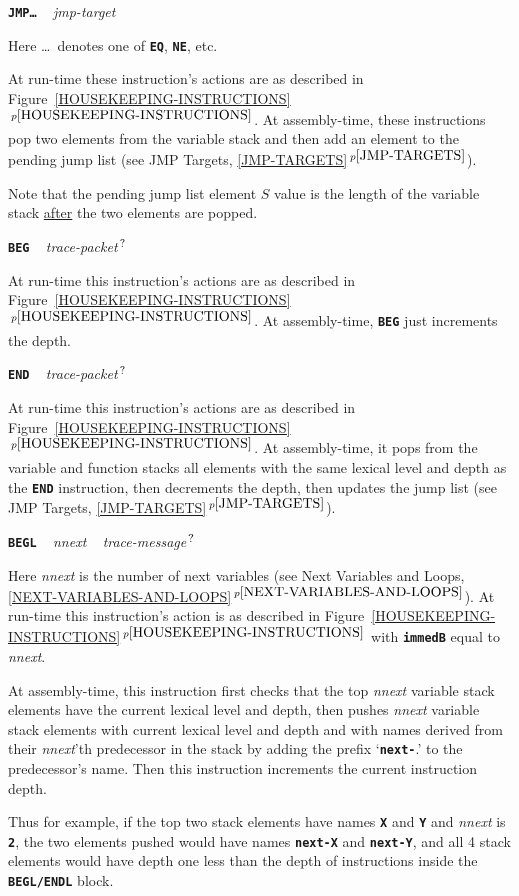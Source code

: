 \documentclass[12pt]{article}
\makeatletter
\newcommand{\TT}[1]{{\tt \bfseries #1}}
\newcommand{\QMARK}{{$^{\,\mbox{\footnotesize ?}}$}}
\newcommand{\ttkey}[1]{\TT{#1}\index{#1@{\tt #1}}}
\newcommand{\itemref}[1]{\ref{#1}$\,^{p\pageref{#1}}$}
\newenvironment{indpar}[1][0.3in]%
	{\begin{list}{}%
		     {\setlength{\itemsep}{0in}%
		      \setlength{\topsep}{0in}%
		      \setlength{\parsep}{1ex}%
		      \setlength{\labelwidth}{#1}%
		      \setlength{\leftmargin}{#1}%
		      \addtolength{\leftmargin}{\labelsep}}%
	 \item}%
	{\end{list}}
\makeatother
\begin{document}
\ttkey{JMP\ldots} ~ {\em jmp-target}
\begin{indpar}
Here \ldots~denotes one of \TT{EQ}, \TT{NE}, etc.

At run-time these instruction's actions are as described in
Figure~\itemref{HOUSEKEEPING-INSTRUCTIONS}.  At assembly-time,
these instructions pop two elements from the variable stack
and then add an element to the pending jump list
(see JMP Targets, \itemref{JMP-TARGETS}).

Note that
the pending jump list element
$S$ value is the length of the variable stack \underline{after}
the two elements are popped.
\end{indpar}

\ttkey{BEG} ~ {\em trace-packet}\QMARK{}
\begin{indpar}
At run-time this instruction's actions are as described in
Figure~\itemref{HOUSEKEEPING-INSTRUCTIONS}.  At assembly-time,
\TT{BEG} just increments the depth.
\end{indpar}

\ttkey{END} ~ {\em trace-packet}\QMARK{}
\begin{indpar}
At run-time this instruction's actions are as described in
Figure~\itemref{HOUSEKEEPING-INSTRUCTIONS}.  At assembly-time,
it pops from the variable and function stacks all elements with the
same lexical level and depth as the \TT{END} instruction, then
decrements the depth, then updates the jump list
(see JMP Targets, \itemref{JMP-TARGETS}).
\end{indpar}

\ttkey{BEGL} ~ {\em nnext} ~ {\em trace-message}\QMARK{}
\begin{indpar}
Here {\em nnext} is the number of next variables
(see Next Variables and Loops, \itemref{NEXT-VARIABLES-AND-LOOPS}).
At run-time this instruction's action is as described in
Figure~\itemref{HOUSEKEEPING-INSTRUCTIONS} with \TT{immedB} equal
to {\em nnext}.

At assembly-time, this instruction first checks that the
top {\em nnext} variable stack elements have the current lexical level
and depth,
then pushes {\em nnext} variable stack elements with current lexical
level and depth
and with names derived from their {\em nnext}'th predecessor
in the stack by adding the prefix `\TT{next-}.' to the predecessor's
name.  Then this instruction increments the current instruction depth.

Thus for example, if the top two stack elements have names
\TT{X} and \TT{Y} and {\em nnext} is \TT{2}, the two elements
pushed would have names \TT{next-X} and \TT{next-Y}, and
all 4 stack elements would have depth one less than the depth
of instructions inside the \TT{BEGL/ENDL} block.
\end{indpar}
\end{document}
